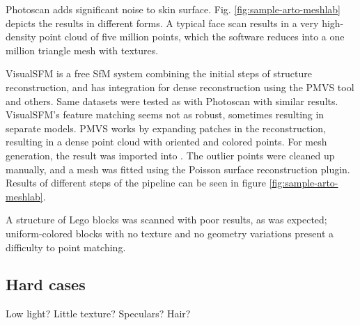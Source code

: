 Photoscan adds significant noise to skin surface.
Fig. \ref{fig:sample-arto-meshlab} depicts the results in different forms.
A typical face scan results in a very high-density point cloud of five million points, which the software reduces into a one million triangle mesh with textures.



VisualSFM \cite{visualsfm} is a free SfM system combining the initial steps of structure reconstruction, and has integration for dense reconstruction using the PMVS \cite{pmvs} tool and others.
Same datasets were tested as with Photoscan with similar results.
VisualSFM's feature matching seems not as robust, sometimes resulting in separate models.
PMVS \cite{pmvs} works by expanding patches in the reconstruction, resulting in a dense point cloud with oriented and colored points.
For mesh generation, the result was imported into \cite{Meshlab}.
The outlier points were cleaned up manually, and a mesh was fitted using the Poisson surface reconstruction plugin.
Results of different steps of the pipeline can be seen in figure \ref{fig:sample-arto-meshlab}.


A structure of Lego blocks was scanned with poor results, as was expected; uniform-colored blocks with no texture and no geometry variations present a difficulty to point matching.


\subsection{Hard cases}

Low light? Little texture? Speculars? Hair?


